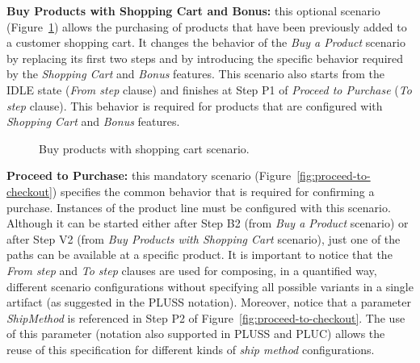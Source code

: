 \documentclass[11pt]{report}
\begin{document}
{\bf Buy Products with Shopping Cart and Bonus:} this optional scenario
(Figure~\ref{fig:buy-product-changing-flow}) allows the purchasing of products
that have been previously added to a customer shopping cart. It changes the
behavior of the \emph{Buy a Product} scenario by replacing its first two steps
and by introducing the specific behavior required by the \emph{Shopping Cart} and
\emph{Bonus} features. This scenario also starts from the IDLE state (\emph{From
step} clause) and finishes at Step P1 of \emph{Proceed to Purchase} (\emph{To
step} clause). This behavior is required for products that are configured with
\emph{Shopping Cart} and \emph{Bonus} features.

\begin{figure}[h]
 \caption{Buy products with shopping cart scenario.}
\label{fig:buy-product-changing-flow}
\end{figure}

{\bf Proceed to Purchase:} this mandatory scenario
(Figure~\ref{fig:proceed-to-checkout}) specifies the common behavior that is
required for confirming a purchase. Instances of the product line must be
configured with this scenario. Although it can be started  either after Step B2
(from \emph{Buy a Product} scenario) or after Step V2 (from \emph{Buy Products
with Shopping Cart} scenario), just one of the paths can be available at a
specific product. It is important to notice that the \emph{From step} and
\emph{To step} clauses are used for composing, in a quantified way, different
scenario configurations without specifying all possible variants in a single
artifact (as suggested in the PLUSS notation). Moreover, notice that a parameter
\emph{ShipMethod} is referenced in Step P2 of
Figure~\ref{fig:proceed-to-checkout}. The use of this parameter (notation also
supported in PLUSS and PLUC) allows the reuse of this specification for different
kinds of \emph{ship method} configurations.
\end{document}

